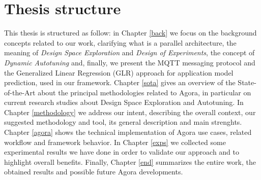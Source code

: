 \section{Thesis structure}

This thesis is structured as follow: in Chapter \ref{back} we focus on the background concepts related to our work, clarifying what is a parallel architecture, the meaning of \textit{Design Space Exploration} and \textit{Design of Experiments}, the concept of \textit{Dynamic Autotuning} and, finally, we present the MQTT messaging protocol and the Generalized Linear Regression (GLR) approach for application model prediction, used in our framework. Chapter \ref{sota} gives an overview of the State-of-the-Art about the principal methodologies related to Agora, in particular on current research studies about Design Space Exploration and Autotuning. In Chapter \ref{methodology} we address our intent, describing the overall context, our suggested methodology and tool, its general description and main strenghts. Chapter \ref{agora} shows the technical implementation of Agora use cases, related workflow and framework behavior. In Chapter \ref{exps} we collected some experimental results we have done in order to validate our approach and to highlight overall benefits. Finally, Chapter \ref{end} summarizes the entire work, the obtained results and possible future Agora developments.
